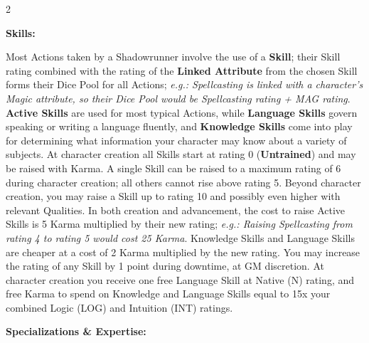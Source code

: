 \documentclass[
  oneside]{article}
\begin{document}
\begin{multicols}{2}

\textbf{Skills:}

Most Actions taken by a Shadowrunner involve the
use of a \textbf{Skill}; their Skill rating
combined with the rating of the \textbf{Linked
Attribute} from the chosen Skill forms their Dice
Pool for all Actions; \emph{e.g.: Spellcasting is
linked with a character's Magic attribute, so
their Dice Pool would be Spellcasting rating + MAG
rating}. \textbf{Active Skills} are used for most
typical Actions, while \textbf{Language Skills}
govern speaking or writing a language fluently,
and \textbf{Knowledge Skills} come into play for
determining what information your character may
know about a variety of subjects. At character
creation all Skills start at rating 0
(\textbf{Untrained}) and may be raised with Karma.
A single Skill can be raised to a maximum rating
of 6 during character creation; all others cannot
rise above rating 5. Beyond character creation,
you may raise a Skill up to rating 10 and possibly
even higher with relevant Qualities. In both
creation and advancement, the cost to raise Active
Skills is 5 Karma multiplied by their new rating;
\emph{e.g.: Raising Spellcasting from rating 4 to
rating 5 would cost 25 Karma}. Knowledge Skills
and Language Skills are cheaper at a cost of 2
Karma multiplied by the new rating. You may
increase the rating of any Skill by 1 point during
downtime, at GM discretion. At character creation
you receive one free Language Skill at Native (N)
rating, and free Karma to spend on Knowledge and
Language Skills equal to 15x your combined Logic
(LOG) and Intuition (INT) ratings.

\textbf{Specializations \& Expertise:}


\end{multicols}
\end{document}
